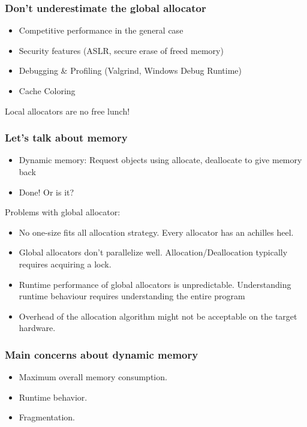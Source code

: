 \documentclass[aspectratio=43]{beamer}
\begin{document}
\begin{frame}
  \frametitle{Don't underestimate the global allocator}

  \begin{itemize}
  \item Competitive performance in the general case
  \item Security features (ASLR, secure erase of freed memory)
  \item Debugging \& Profiling (Valgrind, Windows Debug Runtime)
  \item Cache Coloring
  \end{itemize}

  Local allocators are no free lunch!
\end{frame}



\iffalse
\begin{frame}[fragile]
  \frametitle{Let's talk about memory}
    \begin{itemize}
    \item Dynamic memory: Request objects using allocate, deallocate to give memory back
    \item Done! Or is it?
    \end{itemize}
    Problems with global allocator:
    \begin{itemize}
    \item No one-size fits all allocation strategy. Every allocator has an achilles heel.
    \item Global allocators don't parallelize well. Allocation/Deallocation typically requires acquiring a lock.
    \item Runtime performance of global allocators is unpredictable. Understanding runtime behaviour requires understanding the entire program
    \item Overhead of the allocation algorithm might not be acceptable on the target hardware.
    \end{itemize}
\end{frame}

\begin{frame}[fragile]
  \frametitle{Main concerns about dynamic memory}
    \begin{itemize}
    \item Maximum overall memory consumption.
    \item Runtime behavior.
    \item Fragmentation.
    \end{itemize}
\end{frame}
\end{document}
